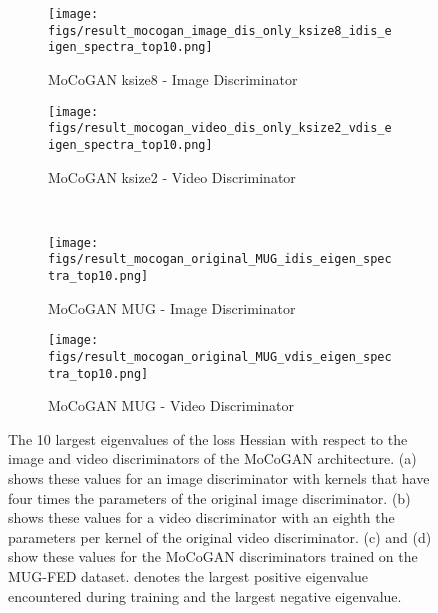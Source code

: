 \documentclass[a4paper,fleqn]{cas-sc}
\begin{document}
\begin{figure}[pos=!h]
    \centering
    \begin{subfigure}[t]{0.5\textwidth}
        \centering
        \texttt{[image: figs/result\_mocogan\_image\_dis\_only\_ksize8\_idis\_eigen\_spectra\_top10.png]}
        \caption{MoCoGAN ksize8 - Image Discriminator}
        \label{fig:MoCoGAN_iDis_EV_ksize8}
    \end{subfigure}\begin{subfigure}[t]{0.5\textwidth}
        \centering
        \texttt{[image: figs/result\_mocogan\_video\_dis\_only\_ksize2\_vdis\_eigen\_spectra\_top10.png]}
        \caption{MoCoGAN ksize2 - Video Discriminator}
        \label{fig:MoCoGAN_vDis_EV_ksize2}
    \end{subfigure}\\
    \begin{subfigure}[t]{0.5\textwidth}
        \centering
        \texttt{[image: figs/result\_mocogan\_original\_MUG\_idis\_eigen\_spectra\_top10.png]}
        \caption{MoCoGAN MUG - Image Discriminator}
        \label{fig:MoCoGAN_iDis_EV_MUG}
    \end{subfigure}\begin{subfigure}[t]{0.5\textwidth}
        \centering
        \texttt{[image: figs/result\_mocogan\_original\_MUG\_vdis\_eigen\_spectra\_top10.png]}
        \caption{MoCoGAN MUG - Video Discriminator}
        \label{fig:MoCoGAN_vDis_EV_MUG}
    \end{subfigure}\caption{The 10 largest eigenvalues of the loss Hessian with respect to the image and video discriminators of the MoCoGAN architecture. (a) shows these values for an image discriminator with kernels that have four times the parameters of the original image discriminator. (b) shows these values for a video discriminator with an eighth the parameters per kernel of the original video discriminator. (c) and (d) show these values for the MoCoGAN discriminators trained on the MUG-FED dataset.  denotes the largest positive eigenvalue encountered during training and  the largest negative eigenvalue.} 
    \label{fig:MoCoGAN_Dis_EV2}
\end{figure}
\end{document}
